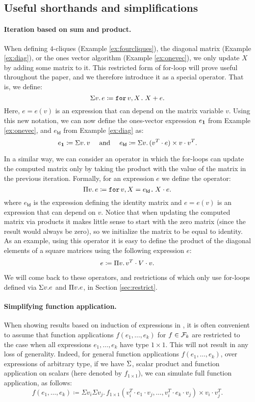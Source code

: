 \subsection{Useful shorthands and simplifications}\label{sec:queries:simp}
\paragraph{Iteration based on sum and product.} When defining $4$-cliques (Example \ref{ex:fourcliques}), the diagonal matrix (Example \ref{ex:diag}), or the ones vector algorithm (Example \ref{ex:onevec}), we 
 only update $X$ by adding some matrix to it. This restricted form of for-loop will prove useful throughout the paper, and we therefore introduce it as a special operator. That is, we define:
$$\Sigma v. \, e \coloneqq  \texttt{for}\, v,X \texttt{.}\, X + e.$$
Here, $e=e(v)$ is an expression that can depend on the matrix variable $v$. 
Using this new notation, we can now define the ones-vector expression $e_{\mathbf{1}}$ from Example \ref{ex:onevec}, and $e_\mathsf{Id}$ from Example \ref{ex:diag} as:
\[ e_{\ones} \coloneqq  \Sigma v. \, v \ \ \ \text{ and } \ \ \ 
e_\mathsf{Id} \coloneqq  \Sigma v. \, (v^T\cdot e)\times v\cdot v^T.
\]

In a similar way, we can consider an operator in which the for-loops can update the computed matrix only by taking the product with the value of the matrix in the previous iteration. Formally, for an expression $e$ we define the operator:
$$
\Pi v.\,  e \coloneqq \texttt{for}\, v,X = e_{\mathsf{Id}} \texttt{.}\, X\cdot e.
$$
where $e_{\mathsf{Id}}$ is the expression defining the identity matrix and $e=e(v)$ is an expression that can depend on $v$. Notice that when updating the computed matrix via products it makes little sense to start with the zero matrix (since the result would always be zero), so we initialize the matrix to be equal to identity. 
As an example, using this operator it is easy to define the product of the diagonal elements of a square matrices using the following expression $e$:
$$
e \coloneqq  \Pi v. \, v^T\cdot V \cdot v.
$$

We will come back to these operators, and restrictions of \langfor which only use for-loops defined via $\Sigma v.e$ and $\Pi v.e$, in Section \ref{sec:restrict}.

\paragraph{Simplifying function application.} When showing results based on induction of expressions in \langfor, it is often convenient to assume that function applications $f(e_1,\ldots,e_k)$ for $f\in\mathcal{F}_k$ are restricted to
the case when all expressions $e_1,\ldots,e_k$ have type $1\times 1$. This will not result in any loss of generality. Indeed,
for general function applications $f(e_1,\ldots,e_k)$, over expressions of arbitrary type, if we have $\Sigma$, scalar product and function application on scalars (here denoted by $f_{1\times 1}$), we can simulate full function application, as follows:
 $$
f(e_1,\ldots, e_k) \coloneqq \Sigma v_i \Sigma v_j. \, f_{1\times 1}(v_i^T\cdot e_1\cdot v_j, \ldots ,v_i^T\cdot e_k\cdot v_j) \times v_i\cdot v_j^T.
$$

